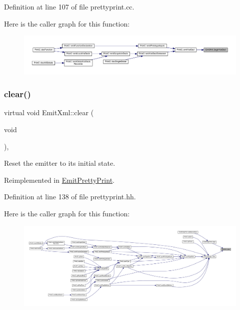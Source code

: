 Definition at line 107 of file prettyprint.\+cc.

Here is the caller graph for this function\+:
\nopagebreak
\begin{figure}[H]
\begin{center}
\leavevmode
\includegraphics[width=350pt]{class_emit_xml_a039212bc4a27cf56f1c70acd4d4623b6_icgraph}
\end{center}
\end{figure}
\mbox{\label{class_emit_xml_a9f19ca4c4bb59ec6b77a58c0d2f783d7}} 
\subsubsection{\texorpdfstring{clear()}{clear()}}
{\footnotesize\ttfamily virtual void Emit\+Xml\+::clear (\begin{DoxyParamCaption}\item[{void}]{ }\end{DoxyParamCaption})\hspace{0.3cm}{\ttfamily [inline]}, {\ttfamily [virtual]}}



Reset the emitter to its initial state. 



Reimplemented in \mbox{\hyperlink{class_emit_pretty_print_aaffabdb012376ddeacebbb0463b7ad79}{Emit\+Pretty\+Print}}.



Definition at line 138 of file prettyprint.\+hh.

Here is the caller graph for this function\+:
\nopagebreak
\begin{figure}[H]
\begin{center}
\leavevmode
\includegraphics[width=350pt]{class_emit_xml_a9f19ca4c4bb59ec6b77a58c0d2f783d7_icgraph}
\end{center}
\end{figure}
\mbox{\label{class_emit_xml_ade0028d33afa198f7211e21c9c673231}} 
